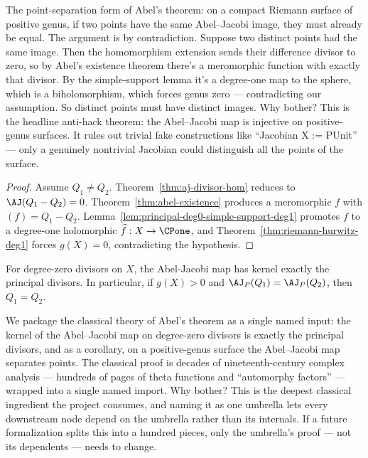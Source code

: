 \begin{layman}
The point-separation form of Abel's theorem: on a compact Riemann
surface of positive genus, if two points have the same Abel–Jacobi
image, they must already be equal. The argument is by contradiction.
Suppose two distinct points had the same image. Then the homomorphism
extension sends their difference divisor to zero, so by Abel's
existence theorem there's a meromorphic function with exactly that
divisor. By the simple-support lemma it's a degree-one map to the
sphere, which is a biholomorphism, which forces genus zero —
contradicting our assumption. So distinct points must have distinct
images. Why bother? This is the headline anti-hack theorem: the
Abel–Jacobi map is injective on positive-genus surfaces. It rules out
trivial fake constructions like ``Jacobian X := PUnit'' — only a
genuinely nontrivial Jacobian could distinguish all the points of the
surface.
\end{layman}

\begin{proof}
Assume \(Q_1\ne Q_2\). Theorem~\ref{thm:aj-divisor-hom} reduces to
\(\AJ(Q_1-Q_2)=0\). Theorem~\ref{thm:abel-existence} produces a
meromorphic \(f\) with \((f)=Q_1-Q_2\).
Lemma~\ref{lem:principal-deg0-simple-support-deg1} promotes \(f\) to a
degree-one holomorphic \(\widehat f:X\to\CPone\), and
Theorem~\ref{thm:riemann-hurwitz-deg1} forces \(g(X)=0\), contradicting
the hypothesis.
\end{proof}

\begin{theorem}
\label{input:abel-theorem}
\leanok
For degree-zero divisors on \(X\), the Abel-Jacobi map has kernel exactly the
principal divisors. In particular, if \(g(X)>0\) and
\(\AJ_P(Q_1)=\AJ_P(Q_2)\), then \(Q_1=Q_2\).
\end{theorem}

\begin{layman}
We package the classical theory of Abel's theorem as a single named
input: the kernel of the Abel–Jacobi map on degree-zero divisors is
exactly the principal divisors, and as a corollary, on a positive-genus
surface the Abel–Jacobi map separates points. The classical proof is
decades of nineteenth-century complex analysis — hundreds of pages of
theta functions and ``automorphy factors'' — wrapped into a single
named import. Why bother? This is the deepest classical ingredient the
project consumes, and naming it as one umbrella lets every downstream
node depend on the umbrella rather than its internals. If a future
formalization splits this into a hundred pieces, only the umbrella's
proof — not its dependents — needs to change.
\end{layman}

